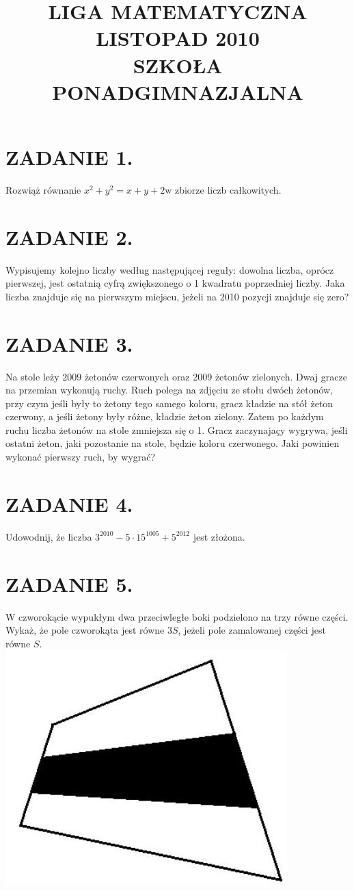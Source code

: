 \documentclass[10pt]{article}
\title{LIGA MATEMATYCZNA \\
 LISTOPAD 2010 \\
 SZKOŁA PONADGIMNAZJALNA }
\author{}
\date{}
\begin{document}
\maketitle
\section*{ZADANIE 1.}
Rozwiąż równanie \(x^{2}+y^{2}=x+y+2 \mathrm{w}\) zbiorze liczb całkowitych.

\section*{ZADANIE 2.}
Wypisujemy kolejno liczby według następującej reguły: dowolna liczba, oprócz pierwszej, jest ostatnią cyfrą zwiększonego o 1 kwadratu poprzedniej liczby. Jaka liczba znajduje się na pierwszym miejscu, jeżeli na 2010 pozycji znajduje się zero?

\section*{ZADANIE 3.}
Na stole leży 2009 żetonów czerwonych oraz 2009 żetonów zielonych. Dwaj gracze na przemian wykonują ruchy. Ruch polega na zdjęciu ze stołu dwóch żetonów, przy czym jeśli były to żetony tego samego koloru, gracz kładzie na stół żeton czerwony, a jeśli żetony były różne, kładzie żeton zielony. Zatem po każdym ruchu liczba żetonów na stole zmniejsza się o 1. Gracz zaczynajaçy wygrywa, jeśli ostatni żeton, jaki pozostanie na stole, będzie koloru czerwonego. Jaki powinien wykonać pierwszy ruch, by wygrać?

\section*{ZADANIE 4.}
Udowodnij, że liczba \(3^{2010}-5 \cdot 15^{1005}+5^{2012}\) jest złożona.

\section*{ZADANIE 5.}
W czworokącie wypukłym dwa przeciwległe boki podzielono na trzy równe części. Wykaż, że pole czworokąta jest równe \(3 S\), jeżeli pole zamalowanej części jest równe \(S\).\\
\includegraphics[max width=\textwidth, center]{2024_11_21_90af61d06b3c3adeff73g-1}
\end{document}

